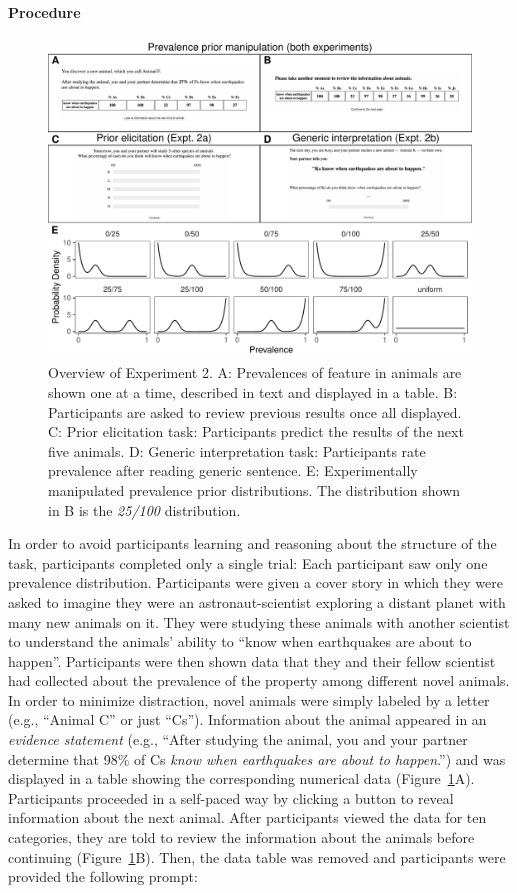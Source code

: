 \documentclass[floatsintext,doc]{apa6}
\let\oldparagraph\paragraph
\renewcommand{\paragraph}[1]{\oldparagraph{#1}\mbox{}}
\begin{document}
\hypertarget{procedure}{%
\paragraph{Procedure}\label{procedure}}
%
\begin{figure}
\centering
\includegraphics{figs/expt2-overview.pdf}
\caption{\label{fig:priorManipulationExpt}Overview of Experiment 2. A: Prevalences of feature in animals are shown one at a time, described in text and displayed in a table. B: Participants are asked to review previous results once all displayed. C: Prior elicitation task: Participants predict the results of the next five animals. D: Generic interpretation task: Participants rate prevalence after reading generic sentence. E: Experimentally manipulated prevalence prior distributions. The distribution shown in B is the \emph{25/100} distribution.}
\end{figure}
%
In order to avoid participants learning and reasoning about the structure of the task, participants completed only a single trial: Each participant saw only one prevalence distribution.
Participants were given a cover story in which they were asked to imagine they were an astronaut-scientist exploring a distant planet with many new animals on it.
They were studying these animals with another scientist to understand the animals' ability to \enquote{know when earthquakes are about to happen}.
Participants were then shown data that they and their fellow scientist had collected about the prevalence of the property among different novel animals.
In order to minimize distraction, novel animals were simply labeled by a letter (e.g., \enquote{Animal C} or just \enquote{Cs}).
Information about the animal appeared in an \emph{evidence statement} (e.g., \enquote{After studying the animal, you and your partner determine that 98\% of Cs \emph{know when earthquakes are about to happen}.}) and was displayed in a table showing the corresponding numerical data (Figure~\ref{fig:priorManipulationExpt}A).
Participants proceeded in a self-paced way by clicking a button to reveal information about the next animal.
After participants viewed the data for ten categories, they are told to review the information about the animals before continuing (Figure~\ref{fig:priorManipulationExpt}B).
Then, the data table was removed and participants were provided the following prompt:
\end{document}
